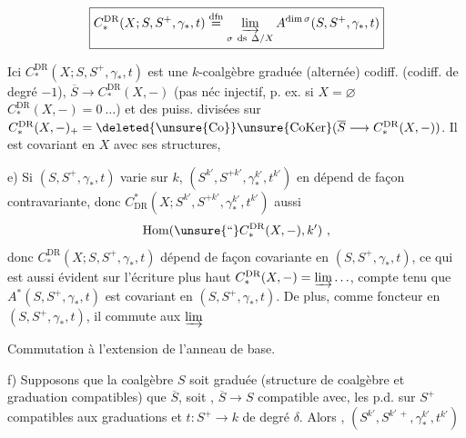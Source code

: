 \[
\boxed{C_*^{\mathrm{DR}}(X;S,S^+,\gamma_*,t)
 \mathrel{\overset{\mathrm{dfn}}{=}}\varinjlim_{\sigma\ \mathrm{ds}\ \Delta/X}
 A^{\mathrm{dim}\,\sigma}(S,S^+,\gamma_*,t)}
\]

Ici $C_*^{\mathrm{DR}}(X;S,S^+,\gamma_*,t)$ est une $k$-coalgèbre graduée (alternée) codiff. (codiff. de degré $-1$),  $\overline S\longrightarrow C_*^{\mathrm{DR}}(X,-)$  (pas néc injectif, p. ex. si $X=\varnothing$ $C_*^{\mathrm{DR}}(X,-)=0\ \ldots$) et des puiss. divisées sur  $C_*^{\mathrm{DR}}(X,-)_+=\deleted{\unsure{\mathrm{Co}}}\unsure{\mathrm{CoKer}}(\overline S\longrightarrow C_*^{\mathrm{DR}}(X,-))$. Il est covariant en $X$ avec  ses structures, 

e) Si $(S,S^+,\gamma_*,t)$ varie sur $k$,  $(S^{k'},S^{+k'},\gamma_*^{k'},t^{k'})$ en dépend de façon contravariante, donc $C_{\mathrm{DR}}^*(X;S^{k'},S^{+k'},\gamma_*^{k'},t^{k'})$ aussi
\[
 \mathrm{Hom}(\unsure{\text{\textquotedblleft}}C_*^{\mathrm{DR}}(X,-),k')\ ,
\]
donc $C_*^{\mathrm{DR}}(X;S,S^+,\gamma_*,t)$ dépend de façon covariante en $(S,S^+,\gamma_*,t)$, ce qui est aussi évident sur l'écriture plus haut $C_*^{\mathrm{DR}}(X,-)=\varinjlim\ldots$, compte tenu que $A^*(S,S^+,\gamma_*,t)$ est covariant en $(S,S^+,\gamma_*,t)$. De plus,  comme foncteur en $(S,S^+,\gamma_*,t)$, il commute aux $\varinjlim$ 

Commutation à l'extension de l'anneau de base.

f) Supposons que la coalgèbre $S$ soit graduée (structure de coalgèbre et graduation compatibles) que $\overline S$, soit , $\overline S\to S$ compatible avec, les p.d. sur $S^+$ compatibles aux graduations et $t:S^+\to k$  de degré $\delta$. Alors , $(S^{k'},S^{k'\,+},\gamma_*^{k'},t^{k'})$
